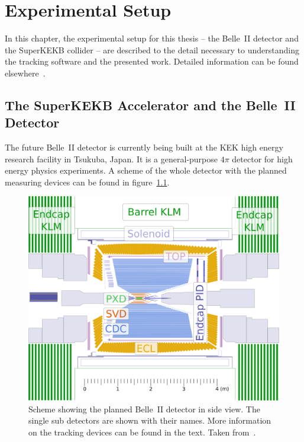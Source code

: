 \chapter{Experimental Setup} \label{chapter-ex}
In this chapter, the experimental setup for this thesis -- the Belle~II detector and the SuperKEKB collider -- are described to the detail necessary to understanding the tracking software and the presented work. Detailed information can be found elsewhere~\cite{tdr}.


\section{The SuperKEKB Accelerator and the Belle~II Detector}

The future Belle~II detector is currently being built at the KEK high energy research facility in Tsukuba, Japan. It is a general-purpose $4\pi$ detector for high energy physics experiments. A scheme of the whole detector with the planned measuring devices can be found in figure~\ref{fig-belle2}.

\begin{figure}
 \centering
 \includegraphics[height=0.4\textheight]{figures/experimental_setup/detector_crossection_labels.pdf}
 \caption[Schema of the planned Belle~II detector.]{Scheme showing the planned Belle~II detector in side view. The single sub detectors are shown with their names. More information on the tracking devices can be found in the text. Taken from~\cite{christian}.}
 \label{fig-belle2}
\end{figure}

